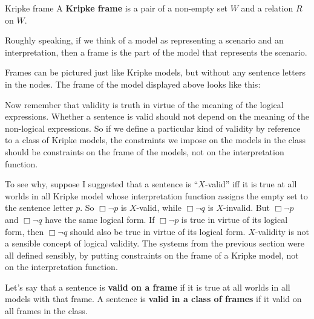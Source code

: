 \begin{definition}{}{Kripke frame}
  A \textbf{Kripke frame} is a pair of a non-empty set $W$ and a relation $R$ on $W$.
\end{definition}

Roughly speaking, if we think of a model as representing a scenario and an
interpretation, then a frame is the part of the model that represents the
scenario.


Frames can be pictured just like Kripke models, but without any sentence letters
in the nodes. The frame of the model displayed above looks like this:
\begin{center}
\end{center}

Now remember that validity is truth in virtue of the meaning of the logical
expressions. Whether a sentence is valid should not depend on the
meaning of the non-logical expressions. So if we define a particular kind of
validity by reference to a class of Kripke models, the constraints we impose on
the models in the class should be constraints on the frame of the models, not on
the interpretation function.

To see why, suppose I suggested that a sentence is ``$X$-valid'' iff it is true
at all worlds in all Kripke model whose interpretation function assigns the
empty set to the sentence letter $p$. So $\Box \neg p$ is $X$-valid, while
$\Box \neg q$ is $X$-invalid. But $\Box \neg p$ and $\Box \neg q$ have the same
logical form. If $\Box \neg p$ is true in virtue of its logical form, then
$\Box \neg q$ should also be true in virtue of its logical form. $X$-validity is
not a sensible concept of logical validity. The systems from the previous
section were all defined sensibly, by putting constraints on the frame of a
Kripke model, not on the interpretation function.

Let's say that a sentence is \textbf{valid on a frame} if it is true at all
worlds in all models with that frame. A sentence is \textbf{valid in a class of
  frames} if it valid on all frames in the class.

